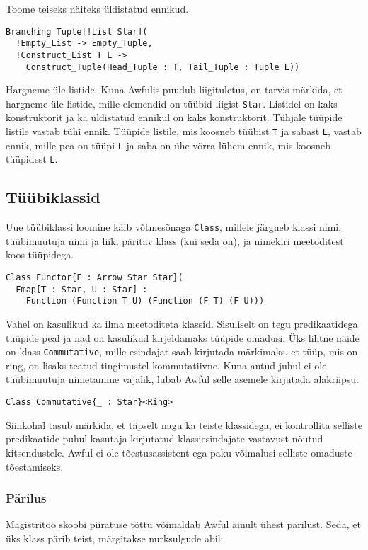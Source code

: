 \documentclass[12pt]{article}
\begin{document}
        Toome teiseks näiteks üldistatud ennikud.

        \begin{verbatim}Branching Tuple[!List Star](
  !Empty_List -> Empty_Tuple,
  !Construct_List T L ->
    Construct_Tuple(Head_Tuple : T, Tail_Tuple : Tuple L))\end{verbatim}

        Hargneme üle listide. Kuna Awfulis puudub liigituletus, on tarvis märkida, et hargneme üle listide, mille elemendid on tüübid liigist \verb!Star!. Listidel on kaks konstruktorit ja ka üldistatud ennikul on kaks konstruktorit. Tühjale tüüpide listile vastab tühi ennik. Tüüpide listile, mis koosneb tüübist \verb!T! ja sabast \verb!L!, vastab ennik, mille pea on tüüpi \verb!L! ja saba on ühe võrra lühem ennik, mis koosneb tüüpidest \verb!L!.
    \subsection{Tüübiklassid}
      Uue tüübiklassi loomine käib võtmesõnaga \verb!Class!, millele järgneb klassi nimi, tüübimuutuja nimi ja liik, päritav klass (kui seda on), ja nimekiri meetoditest koos tüüpidega.

      \begin{verbatim}Class Functor{F : Arrow Star Star}(
  Fmap[T : Star, U : Star] :
    Function (Function T U) (Function (F T) (F U)))\end{verbatim}

      Vahel on kasulikud ka ilma meetoditeta klassid. Sisuliselt on tegu predikaatidega tüüpide peal ja nad on kasulikud kirjeldamaks tüüpide omadusi. Üks lihtne näide on klass \verb!Commutative!, mille esindajat saab kirjutada märkimaks, et tüüp, mis on ring, on lisaks teatud tingimustel kommutatiivne. Kuna antud juhul ei ole tüübimuutuja nimetamine vajalik, lubab Awful selle asemele kirjutada alakriipsu.

      \begin{verbatim}Class Commutative{_ : Star}<Ring>\end{verbatim}

      Siinkohal tasub märkida, et täpselt nagu ka teiste klassidega, ei kontrollita selliste predikaatide puhul kasutaja kirjutatud klassiesindajate vastavust nõutud kitsendustele. Awful ei ole tõestusassistent ega paku võimalusi selliste omaduste tõestamiseks.
      \subsubsection{Pärilus}
        Magistritöö skoobi piiratuse tõttu võimaldab Awful ainult ühest pärilust. Seda, et üks klass pärib teist, märgitakse nurksulgude abil:
\end{document}
